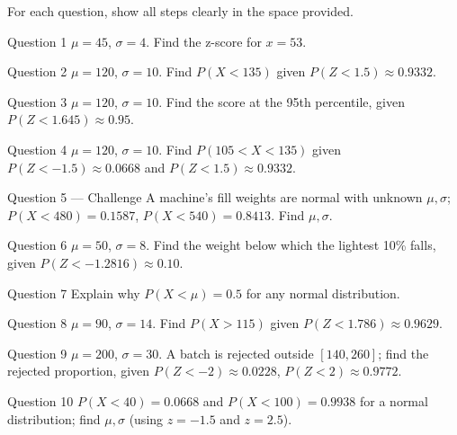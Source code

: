 \documentclass[11pt]{article}
\begin{document}
\clearpage
{}
For each question, show all steps clearly in the space provided.

\begin{qbox}{Question 1}
$\mu=45$, $\sigma=4$. Find the z-score for $x=53$.\workspace{2.4cm}
\end{qbox}

\begin{qbox}{Question 2}
$\mu=120$, $\sigma=10$. Find $P(X<135)$ given $P(Z<1.5)\approx0.9332$.\workspace{2.4cm}
\end{qbox}

\begin{qbox}{Question 3}
$\mu=120$, $\sigma=10$. Find the score at the 95th percentile, given $P(Z<1.645)\approx0.95$.\workspace{2.4cm}
\end{qbox}

\begin{qbox}{Question 4}
$\mu=120$, $\sigma=10$. Find $P(105<X<135)$ given $P(Z<-1.5)\approx0.0668$ and $P(Z<1.5)\approx0.9332$.\workspace{2.4cm}
\end{qbox}

\begin{qbox}{Question 5 --- Challenge}
A machine's fill weights are normal with unknown $\mu,\sigma$; $P(X<480)=0.1587$, $P(X<540)=0.8413$. Find $\mu,\sigma$.\workspace{3.2cm}
\end{qbox}

\begin{qbox}{Question 6}
$\mu=50$, $\sigma=8$. Find the weight below which the lightest 10\% falls, given $P(Z<-1.2816)\approx0.10$.\workspace{2.4cm}
\end{qbox}

\begin{qbox}{Question 7}
Explain why $P(X<\mu)=0.5$ for any normal distribution.\workspace{2.4cm}
\end{qbox}

\begin{qbox}{Question 8}
$\mu=90$, $\sigma=14$. Find $P(X>115)$ given $P(Z<1.786)\approx0.9629$.\workspace{2.4cm}
\end{qbox}

\begin{qbox}{Question 9}
$\mu=200$, $\sigma=30$. A batch is rejected outside $[140,260]$; find the rejected proportion, given $P(Z<-2)\approx0.0228$, $P(Z<2)\approx0.9772$.\workspace{2.4cm}
\end{qbox}

\begin{qbox}{Question 10}
$P(X<40)=0.0668$ and $P(X<100)=0.9938$ for a normal distribution; find $\mu,\sigma$ (using $z=-1.5$ and $z=2.5$).\workspace{2.4cm}
\end{qbox}
\end{document}
